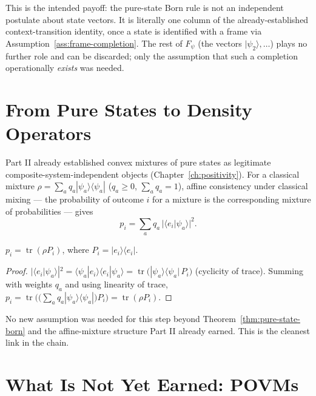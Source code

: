 \begin{remark}
This is the intended payoff: the pure-state Born rule is not an independent
postulate about state vectors. It is literally one column of the
already-established context-transition identity, once a state is identified
with a frame via Assumption~\ref{ass:frame-completion}. The rest of $F_\psi$
(the vectors $|\psi_2\rangle,\dots$) plays no further role and can be
discarded; only the assumption that such a completion operationally
\emph{exists} was needed.
\end{remark}

\section{From Pure States to Density Operators}

Part II already established convex mixtures of pure states as legitimate
composite-system-independent objects (Chapter~\ref{ch:positivity}). For a
classical mixture $\rho = \sum_a q_a |\psi_a\rangle\langle\psi_a|$ ($q_a\ge0$,
$\sum_a q_a=1$), affine consistency under classical mixing — the probability
of outcome $i$ for a mixture is the corresponding mixture of probabilities —
gives
\begin{equation}
p_i = \sum_a q_a\, |\langle e_i|\psi_a\rangle|^2.
\end{equation}

\begin{theorem}
\label{thm:density-born}
$p_i = \operatorname{tr}(\rho P_i)$, where $P_i = |e_i\rangle\langle e_i|$.
\end{theorem}

\begin{proof}
$|\langle e_i|\psi_a\rangle|^2 = \langle\psi_a|e_i\rangle\langle
e_i|\psi_a\rangle = \operatorname{tr}\big(|\psi_a\rangle\langle\psi_a|\,P_i
\big)$ (cyclicity of trace). Summing with weights $q_a$ and using linearity of
trace, $p_i = \operatorname{tr}\Big(\big(\sum_a q_a
|\psi_a\rangle\langle\psi_a|\big) P_i\Big) = \operatorname{tr}(\rho P_i)$.
\end{proof}

\begin{remark}
No new assumption was needed for this step beyond
Theorem~\ref{thm:pure-state-born} and the affine-mixture structure Part II
already earned. This is the cleanest link in the chain.
\end{remark}

\section{What Is Not Yet Earned: POVMs}

